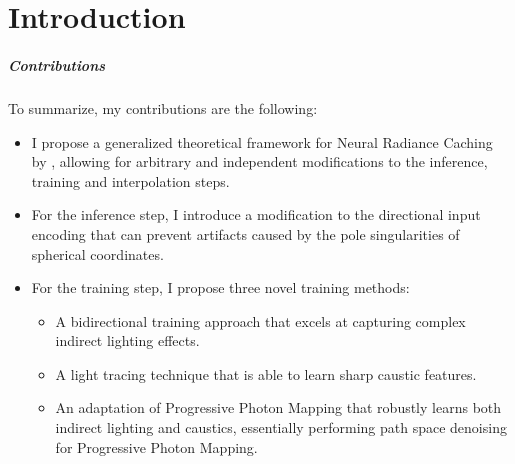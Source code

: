 
\chapter{Introduction}
\label{chap:intro}

\paragraph{Contributions}
To summarize, my contributions are the following:
\begin{itemize}
    \item I propose a generalized theoretical framework for Neural Radiance Caching by \textcite{muller2021}, allowing for arbitrary and independent modifications to the inference, training and interpolation steps.
    \item For the inference step, I introduce a modification to the directional input encoding that can prevent artifacts caused by the pole singularities of spherical coordinates.
    \item For the training step, I propose three novel training methods:
    \begin{itemize}
        \item A bidirectional training approach that excels at capturing complex indirect lighting effects.
        \item A light tracing technique that is able to learn sharp caustic features.
        \item An adaptation of Progressive Photon Mapping \parencite{jensen1996,hachisuka2008} that robustly learns both indirect lighting and caustics, essentially performing path space denoising for Progressive Photon Mapping.
    \end{itemize}
\end{itemize}